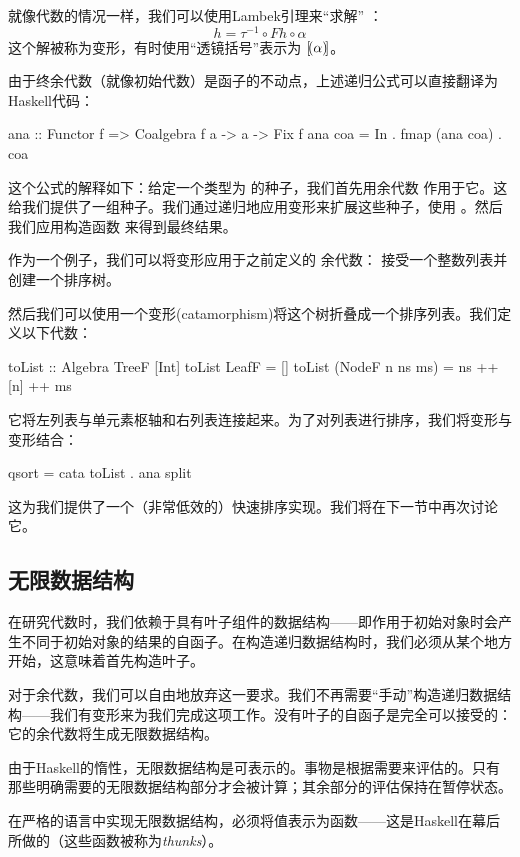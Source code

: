 \documentclass[DaoFP]{subfiles}
\begin{document}
 就像代数的情况一样，我们可以使用Lambek引理来“求解” ：
 \[ h = \tau^{-1} \circ F h \circ \alpha \]
 这个解被称为变形，有时使用\index{$\llens \rlens$}“透镜括号”表示为 $\mathopen{[\!(} \alpha \mathclose{)\!]}$。
 
 由于终余代数（就像初始代数）是函子的不动点，上述递归公式可以直接翻译为Haskell代码：
 \begin{haskell}
ana :: Functor f => Coalgebra f a -> a -> Fix f
ana coa = In . fmap (ana coa) . coa 
\end{haskell}
这个公式的解释如下：给定一个类型为  的种子，我们首先用余代数  作用于它。这给我们提供了一组种子。我们通过递归地应用变形来扩展这些种子，使用 。然后我们应用构造函数  来得到最终结果。
 
作为一个例子，我们可以将变形应用于之前定义的  余代数： 接受一个整数列表并创建一个排序树。

然后我们可以使用一个变形(catamorphism)将这个树折叠成一个排序列表。我们定义以下代数：
\begin{haskell}
toList :: Algebra TreeF [Int]
toList LeafF = []
toList (NodeF n ns ms) = ns ++ [n] ++ ms
\end{haskell}
它将左列表与单元素枢轴和右列表连接起来。为了对列表进行排序，我们将变形与变形结合：
\begin{haskell}
qsort = cata toList . ana split
\end{haskell}
这为我们提供了一个（非常低效的）快速排序实现。我们将在下一节中再次讨论它。

\subsection{无限数据结构}

在研究代数时，我们依赖于具有叶子组件的数据结构——即作用于初始对象时会产生不同于初始对象的结果的自函子。在构造递归数据结构时，我们必须从某个地方开始，这意味着首先构造叶子。

对于余代数，我们可以自由地放弃这一要求。我们不再需要“手动”构造递归数据结构——我们有变形来为我们完成这项工作。没有叶子的自函子是完全可以接受的：它的余代数将生成无限数据结构。

由于Haskell的惰性，无限数据结构是可表示的。事物是根据需要来评估的。只有那些明确需要的无限数据结构部分才会被计算；其余部分的评估保持在暂停状态。

在严格的语言中实现无限数据结构，必须将值表示为函数——这是Haskell在幕后所做的（这些函数被称为\emph{thunks}）。
\end{document}
